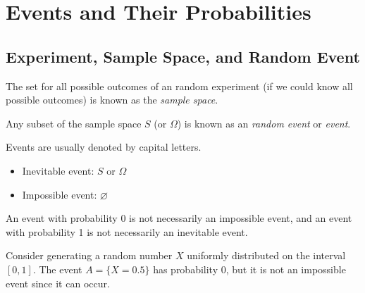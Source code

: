 \chapter{Events and Their Probabilities}

\section{Experiment, Sample Space, and Random Event}

\begin{definition}
  The set for all possible outcomes of an random experiment (if we could know all possible outcomes) is known as the \emph{sample space}.
\end{definition}

\begin{definition}
  Any subset of the sample space \(S\) (or \(\Omega\)) is known as an \emph{random event} or \emph{event}.
\end{definition}
Events are usually denoted by capital letters.

\begin{itemize}
  \item Inevitable event: \(S\) or \(\Omega\)
  \item Impossible event: \(\varnothing\)
\end{itemize}
\begin{remark}
An event with probability 0 is not necessarily an impossible event, and an event with probability 1 is not necessarily an inevitable event.
\end{remark}
\begin{example}
  Consider generating a random number \(X\) uniformly distributed on the interval \([0, 1]\). The event \(A = \{X = 0.5\}\) has probability 0, but it is not an impossible event since it can occur.
\end{example}

